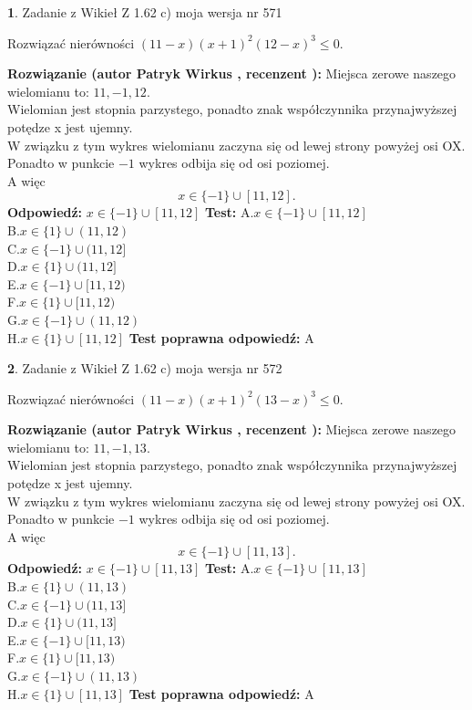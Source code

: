 \documentclass[12pt, a4paper]{article}
\theoremstyle{definition} %
\newtheorem{zad}{}
\newcommand{\zadStart}[1]{\begin{zad}#1\newline}
\newcommand{\zadStop}{\end{zad}}
\newcommand{\rozwStart}[2]{\noindent \textbf{Rozwiązanie (autor #1 , recenzent #2): }\newline}
\newcommand{\rozwStop}{\newline}
\newcommand{\odpStart}{\noindent \textbf{Odpowiedź:}\newline}
\newcommand{\odpStop}{\newline}
\newcommand{\testStart}{\noindent \textbf{Test:}\newline}
\newcommand{\testStop}{\newline}
\newcommand{\kluczStart}{\noindent \textbf{Test poprawna odpowiedź:}\newline}
\newcommand{\kluczStop}{\newline}
\begin{document}
\zadStart{Zadanie z Wikieł Z 1.62 c) moja wersja nr 571}

Rozwiązać nierówności $(11-x)(x+1)^{2}(12-x)^{3}\le0$.
\zadStop
\rozwStart{Patryk Wirkus}{}
Miejsca zerowe naszego wielomianu to: $11, -1, 12$.\\
Wielomian jest stopnia parzystego, ponadto znak współczynnika przy\linebreak najwyższej potędze x jest ujemny.\\ W związku z tym wykres wielomianu zaczyna się od lewej strony powyżej osi OX.\\
Ponadto w punkcie $-1$ wykres odbija się od osi poziomej.\\
A więc $$x \in \{-1\} \cup [11,12].$$
\rozwStop
\odpStart
$x \in \{-1\} \cup [11,12]$
\odpStop
\testStart
A.$x \in \{-1\} \cup [11,12]$\\
B.$x \in \{1\} \cup (11,12)$\\
C.$x \in \{-1\} \cup (11,12]$\\
D.$x \in \{1\} \cup (11,12]$\\
E.$x \in \{-1\} \cup [11,12)$\\
F.$x \in \{1\} \cup [11,12)$\\
G.$x \in \{-1\} \cup (11,12)$\\
H.$x \in \{1\} \cup [11,12]$
\testStop
\kluczStart
A
\kluczStop



\zadStart{Zadanie z Wikieł Z 1.62 c) moja wersja nr 572}

Rozwiązać nierówności $(11-x)(x+1)^{2}(13-x)^{3}\le0$.
\zadStop
\rozwStart{Patryk Wirkus}{}
Miejsca zerowe naszego wielomianu to: $11, -1, 13$.\\
Wielomian jest stopnia parzystego, ponadto znak współczynnika przy\linebreak najwyższej potędze x jest ujemny.\\ W związku z tym wykres wielomianu zaczyna się od lewej strony powyżej osi OX.\\
Ponadto w punkcie $-1$ wykres odbija się od osi poziomej.\\
A więc $$x \in \{-1\} \cup [11,13].$$
\rozwStop
\odpStart
$x \in \{-1\} \cup [11,13]$
\odpStop
\testStart
A.$x \in \{-1\} \cup [11,13]$\\
B.$x \in \{1\} \cup (11,13)$\\
C.$x \in \{-1\} \cup (11,13]$\\
D.$x \in \{1\} \cup (11,13]$\\
E.$x \in \{-1\} \cup [11,13)$\\
F.$x \in \{1\} \cup [11,13)$\\
G.$x \in \{-1\} \cup (11,13)$\\
H.$x \in \{1\} \cup [11,13]$
\testStop
\kluczStart
A
\kluczStop
\end{document}
